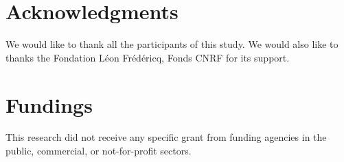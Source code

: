 \section{Acknowledgments}

We would like to thank all the participants of this study.  We would also like to thanks the Fondation Léon Frédéricq, Fonds CNRF for its support. 
 

\medbreak

%



\section{Fundings} This research did not receive any specific grant from funding agencies in the public, commercial, or not-for-profit sectors.

\medbreak

